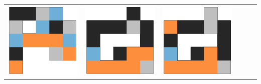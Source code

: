 \begin{tabular}{cccccc}
    \hline \rule{0pt}{9ex}  
    \includegraphics[scale=0.1]{images/top_designs/walker/ga/ga5_gen29_ind0} &
    \includegraphics[scale=0.1]{images/top_designs/walker/ga/ga5_gen29_ind1} &
    \includegraphics[scale=0.1]{images/top_designs/walker/ga/ga5_gen29_ind2} &

\end{tabular}
